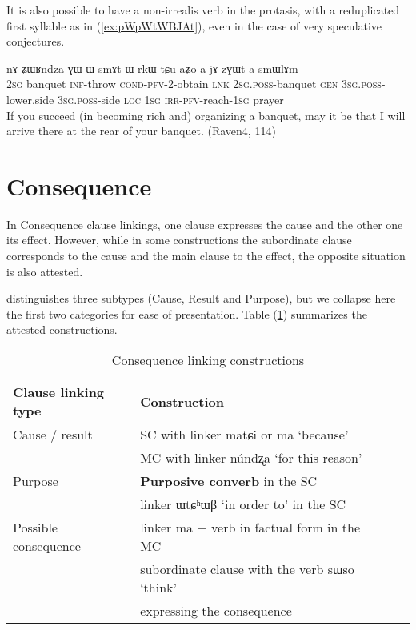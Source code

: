 \documentclass[oldfontcommands,oneside,a4paper,11pt]{article}
\newcommand{\ipa}[1]{{\phon \mbox{#1}}} %
\newcommand{\refb}[1]{(\ref{#1})}
\begin{document}
 
 It is also possible to have a non-irrealis verb in the protasis, with a reduplicated first syllable as in \refb{ex:pWpWtWBJAt}, even in the case of very speculative conjectures.
\begin{exe}
\ex \label{ex:pWpWtWBJAt}
\gll 
[\ipa{nɤʑo}  	\ipa{ʑɯʁndza}  	\ipa{kɤ-lɤt}  	\textbf{\ipa{pɯ-pɯ-tɯ-βɟɤt}}]  	\ipa{nɤ,}  	\ipa{nɤ-ʑɯʁndza}  	\ipa{ɣɯ}  	\ipa{ɯ-smɤt}  	\ipa{ɯ-rkɯ}  	\ipa{tɕu}  	\ipa{aʑo}  	\ipa{a-jɤ-zɣɯt-a}  	\ipa{smɯlɤm}  \\
\textsc{2sg} banquet \textsc{inf}-throw \textsc{cond-pfv}-2-obtain \textsc{lnk} \textsc{2sg.poss}-banquet \textsc{gen} \textsc{3sg.poss}-lower.side \textsc{3sg.poss}-side \textsc{loc} \textsc{1sg} \textsc{irr-pfv}-reach-\textsc{1sg} prayer \\
\glt  If you succeed (in becoming rich and) organizing a banquet, may it be that I will arrive there at the rear of your banquet. (Raven4, 114)
\end{exe} 


\section{Consequence}
In Consequence clause linkings, one clause expresses the cause and the other one its effect. However, while in some constructions the subordinate clause corresponds to the cause and the main clause to the effect, the opposite situation is also attested.  

\citet[17, 44]{dixon09intro} distinguishes three subtypes (Cause, Result and Purpose), but we collapse here the first two categories for ease  of presentation. Table \refb{tab:consequence} summarizes the attested constructions.


\begin{table}[h]
\caption{Consequence linking constructions} \label{tab:consequence}
\begin{tabular}{lllll}
\toprule
 Clause linking type &Construction \\
\midrule
 Cause / result & SC with linker \ipa{matɕi} or \ipa{ma} `because'\\
 & MC with linker \ipa{núndʐa} `for this reason' \\
 \midrule
Purpose & \textbf{Purposive converb} in the SC\\
& linker \ipa{ɯtɕʰɯβ} `in order to' in the SC\\
 \midrule
Possible consequence &  linker   \ipa{ma} + verb in factual form in the MC \\
& subordinate clause with the verb \ipa{sɯso} `think' \\
&expressing the consequence\\
\bottomrule
\end{tabular}
\end{table}
\end{document}

